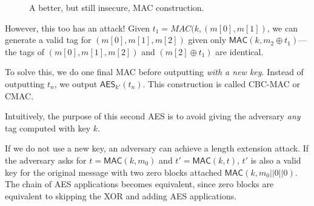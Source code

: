\begin{figure}[htpb]
	\centering
	\caption{A better, but still insecure, MAC construction.}
	\label{fig:}
\end{figure}

However, this too has an attack! Given $t_1 = MAC(k, (m[0], m[1])$, we can generate a valid tag for $(m[0], m[1], m[2])$ given only $\mathsf{MAC}(k, m_2 \oplus t_1)$---the tags of $(m[0], m[1], m[2])$ and $(m[2] \oplus t_1)$ are identical.

	To solve this, we do one final MAC before outputting \emph{with a new key}. Instead of outputting $t_n$, we output $\mathsf{AES}_{k'}(t_n)$. This construction is called CBC-MAC or CMAC. %

	Intuitively, the purpose of this second AES is to avoid giving the adversary \textit{any} tag computed with key $k$. 

	If we do not use a new key, an adversary can achieve a length extension attack. If the adversary asks for $t = \mathsf{MAC}(k, m_0)$ and $t' = \mathsf{MAC}(k, t)$, $t'$ is also a valid key for the original message with two zero blocks attached $\mathsf{MAC}(k, m_0 || 0 || 0)$. The chain of AES applications becomes equivalent, since zero blocks are equivalent to skipping the XOR and adding AES applications.

